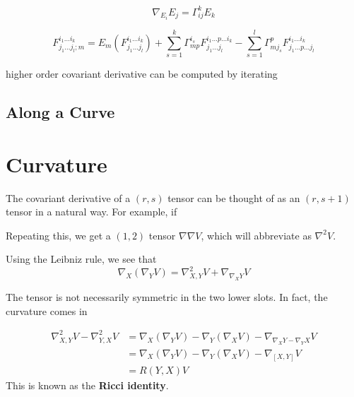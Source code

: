 \begin{equation*}
    \nabla_{E_i}E_j=\Gamma^k_{ij}E_k
\end{equation*}


\begin{proposition}
    \begin{equation*}
        F^{i_1\dots i_k}_{j_1\dots j_l;m}=E_m(F^{i_1\dots i_k}_{j_1\dots j_l})+\sum_{s=1}^{k}\Gamma^{i_s}_{mp} F^{i_1 \dots p \dots i_k}_{j_1\dots j_l}-\sum_{s=1}^{l}\Gamma^{p}_{mj_s} F^{i_1 \dots i_k}_{j_1\dots p \dots j_l}
    \end{equation*}
\end{proposition}

higher order covariant derivative can be computed by iterating


\subsection{Along a Curve}

\section{Curvature}

The covariant derivative of a $(r,s)$ tensor can be thought of as an $(r,s+1)$ tensor in a natural way.
For example, if 

Repeating this, we get a $(1,2)$ tensor $\nabla\nabla V$, which will abbreviate as $\nabla^2 V$.

Using the Leibniz rule, we see that 
\begin{equation*}
    \nabla_X(\nabla_Y V)=\nabla^2_{X,Y}V+\nabla_{\nabla_X Y}V
\end{equation*}

The tensor is not necessarily symmetric in the two lower slots. In fact, the curvature comes in 

\begin{align*}
    \nabla^2_{X,Y}V-\nabla^2_{Y,X}V&= \nabla_X(\nabla_Y V)-\nabla_Y(\nabla_X V)-\nabla_{\nabla_X Y-\nabla_Y X}V\\
    &=\nabla_X(\nabla_Y V)-\nabla_Y(\nabla_X V)-\nabla_{[X,Y]}V\\
    &=R(Y,X)V
\end{align*}
This is known as the \textbf{Ricci identity}.

\begin{definition}
    
\end{definition}

